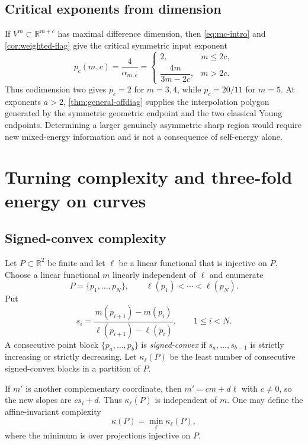 \documentclass[11pt]{amsart}
\numberwithin{equation}{section}
\theoremstyle{definition}
\theoremstyle{remark}
\newcommand{\R}{\mathbb R}
\newcommand{\1}{\mathbf 1}
\begin{document}
\subsection{Critical exponents from dimension}
If $V^m\subset\R^{m+c}$ has maximal difference dimension, then \eqref{eq:mc-intro} and \cref{cor:weighted-flag} give the critical symmetric input exponent
\begin{equation}\label{eq:critical-p}
 p_c(m,c)=\frac4{\alpha_{m,c}}
 =\begin{cases}
 2,&m\leq2c,\\[1mm]
 \dfrac{4m}{3m-2c},&m>2c.
 \end{cases}
\end{equation}
Thus codimension two gives $p_c=2$ for $m=3,4$, while $p_c=20/11$ for $m=5$.  At exponents $a>2$, \cref{thm:general-offdiag} supplies the interpolation polygon generated by the symmetric geometric endpoint and the two classical Young endpoints.  Determining a larger genuinely asymmetric sharp region would require new mixed-energy information and is not a consequence of self-energy alone.

\section{Turning complexity and three-fold energy on curves}\label{sec:turning}

\subsection{Signed-convex complexity}
Let $P\subset\R^2$ be finite and let $\ell$ be a linear functional that is injective on $P$.  Choose a linear functional $m$ linearly independent of $\ell$ and enumerate
\[
 P=\{p_1,\dots,p_N\},
 \qquad
 \ell(p_1)<\cdots<\ell(p_N).
\]
Put
\begin{equation}\label{eq:adjacent-slopes}
 s_i=\frac{m(p_{i+1})-m(p_i)}{\ell(p_{i+1})-\ell(p_i)},
 \qquad 1\leq i<N.
\end{equation}
A consecutive point block $\{p_a,\dots,p_b\}$ is \emph{signed-convex} if $s_a,\dots,s_{b-1}$ is strictly increasing or strictly decreasing.  Let $\kappa_\ell(P)$ be the least number of consecutive signed-convex blocks in a partition of $P$.

If $m'$ is another complementary coordinate, then $m'=cm+d\ell$ with $c\neq0$, so the new slopes are $cs_i+d$.  Thus $\kappa_\ell(P)$ is independent of $m$.  One may define the affine-invariant complexity
\[
 \kappa(P)=\min_\ell\kappa_\ell(P),
\]
where the minimum is over projections injective on $P$.
\end{document}
